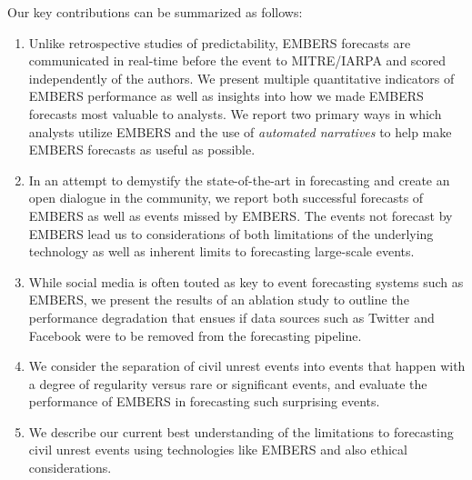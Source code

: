 Our key contributions can be summarized as follows:
\begin{enumerate}
\item Unlike retrospective studies of predictability, EMBERS forecasts are communicated in real-time before the
event to MITRE/IARPA and scored independently of the authors.
We present multiple quantitative indicators of EMBERS performance
as well as insights into how
we made EMBERS forecasts most valuable to analysts. We report two primary
ways in which analysts utilize EMBERS and the use of {\it automated
narratives} to help make EMBERS forecasts as useful as possible.

\item In an attempt to demystify the state-of-the-art
in forecasting and create an open dialogue in the community, we report both successful
forecasts of EMBERS as well as events missed by EMBERS. The events not forecast by EMBERS lead us to
considerations of both limitations of the underlying technology as well as inherent limits to
forecasting large-scale events.
\item While social media is often touted as key to event forecasting
systems such as EMBERS, we present the results of an ablation study to outline
the performance degradation that ensues if data sources
such as Twitter and Facebook were to be removed from the forecasting pipeline.
\item We consider the separation of civil unrest events into events
that happen with a degree of regularity versus rare
or significant
events, and evaluate the performance of EMBERS in forecasting such
surprising events.
\item We describe our current best understanding of the limitations to
forecasting civil unrest events using technologies like EMBERS and
also ethical considerations.
\end{enumerate}

